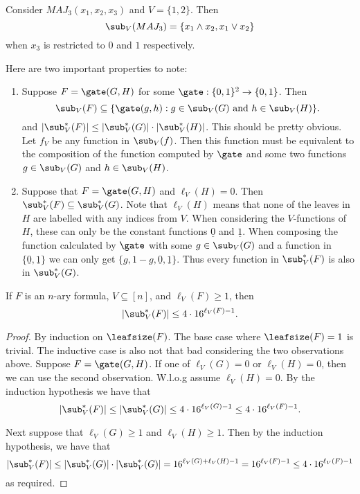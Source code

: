 \begin{example}
	Consider $MAJ_3(x_1, x_2, x_3)$ and $V = \{1, 2\}$. Then 
	\[\sub_V(MAJ_3) = \{x_1 \land x_2, x_1 \lor x_2\}\]
	when $x_3$ is restricted to $0$ and $1$ respectively. 
\end{example}

Here are two important properties to note:
\begin{enumerate}
	\item Suppose $F = \gate(G,H)$ for some $\gate: \{0,1\}^2 \rightarrow \{0,1\}$. Then 
	\[\sub_V(F) \subseteq \{\gate(g, h): g \in \sub_V(G) \mbox{ and } h \in \sub_V(H)\}.\]
	and $|\sub_V^*(F)| \leq |\sub_V^*(G)| \cdot |\sub_V^*(H)|$. This should be pretty obvious. Let $f_V$ be any function in $\sub_V(f)$. Then this function must be equivalent to the composition of the function computed by $\gate$ and some two functions $g \in \sub_V(G)$ and $h \in \sub_V(H)$.
	\item Suppose that $F = \gate(G, H)$ and $\ell_V(H) = 0$. Then $\sub_V^*(F) \subseteq \sub_V^*(G)$. Note that $\ell_V(H)$ means that none of the leaves in $H$ are labelled with any indices from $V$. When considering the $V$-functions of $H$, these can only be the constant functions $\underline{0}$ and $\underline{1}$. When composing the function calculated by $\gate$ with some $g \in \sub_V(G)$ and a function in $\{\underline{0}, \underline{1}\}$ we can only get $\{g, 1-g, \underline{0}, \underline{1}\}$. Thus every function in $\sub_V^*(F)$ is also in $\sub_V^{*}(G)$.
\end{enumerate}

\begin{lemma}
	\label{lem:U-Vsubfunctions}
	If $F$ is an $n$-ary formula, $V \subseteq [n]$, and $\ell_{V}(F) \geq 1$, then \[|\sub_V^*(F)| \leq 4 \cdot 16^{\ell_V(F) - 1}.\] 
\end{lemma}
\begin{proof}
	By induction on $\leafsize(F)$. The base case where $\leafsize(F) = 1$ is trivial. The inductive case is also not that bad considering the two observations above. Suppose $F = \gate(G, H)$. If one of $\ell_V(G) = 0$ or $\ell_V(H) = 0$, then we can use the second observation. W.l.o.g assume $\ell_V(H) = 0$. By the induction hypothesis we have that  
	\[|\sub_V^{*}(F)| \leq |\sub_V^*(G)| \leq 4 \cdot 16^{\ell_V(G) - 1} \leq 4 \cdot 16^{\ell_V(F) - 1}.\]
	
	Next suppose that $\ell_V(G) \geq 1$ and $\ell_V(H) \geq 1$. Then by the induction hypothesis, we have that 
	\[|\sub_V^{*}(F)| \leq |\sub_V^*(G)| \cdot |\sub_V^*(G)| = 16^{\ell_V(G) + \ell_V(H) - 1} = 16^{\ell_V(F) - 1}\leq 4 \cdot 16^{\ell_V(F) - 1}\]
	as required.
\end{proof}

